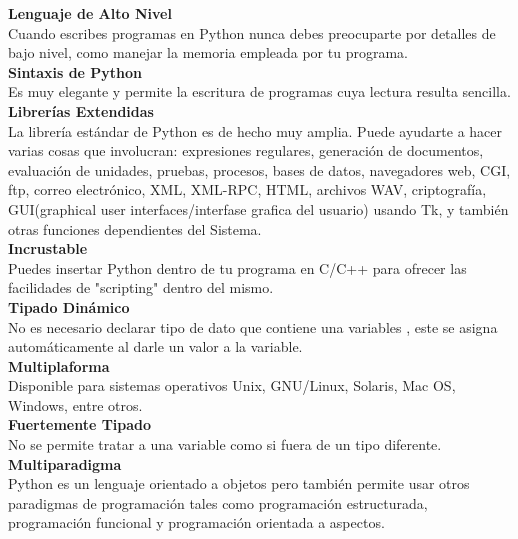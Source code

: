 \documentclass[11pt]{article} %
\begin{document}
\textbf{Lenguaje de Alto Nivel}
\\    Cuando escribes programas en Python nunca debes preocuparte por detalles de bajo nivel, como manejar la memoria empleada por tu programa.\\

\textbf{Sintaxis de Python}
\\	  Es muy elegante y permite la escritura de programas cuya lectura resulta sencilla.\\

\textbf{Librerías Extendidas}
\\	  La librería estándar de Python es de hecho muy amplia. Puede ayudarte a hacer varias cosas que involucran: expresiones regulares, generación de documentos, evaluación de unidades, pruebas, procesos, bases de datos, navegadores web, CGI, ftp, correo electrónico, XML, XML-RPC, HTML, archivos WAV, criptografía, GUI(graphical user interfaces/interfase grafica del usuario) usando Tk, y también otras funciones dependientes del Sistema.\\

\textbf{Incrustable}
\\    Puedes insertar Python dentro de tu programa en C/C++ para ofrecer las facilidades de "scripting" dentro del mismo.\\

\textbf{Tipado Dinámico}
\\    No es necesario declarar tipo de dato que contiene una variables , este se asigna automáticamente al darle un valor a la variable.\\

\textbf{Multiplaforma}
\\   Disponible para sistemas operativos Unix, GNU/Linux, Solaris, Mac OS, Windows, entre otros.\\

\textbf{Fuertemente Tipado}
\\   No se permite tratar a una variable como si fuera de un tipo diferente.\\

\textbf{Multiparadigma}
\\   Python es un lenguaje orientado a objetos pero también permite usar otros paradigmas de programación tales como programación estructurada, programación funcional y programación orientada a aspectos.\\
\end{document}

